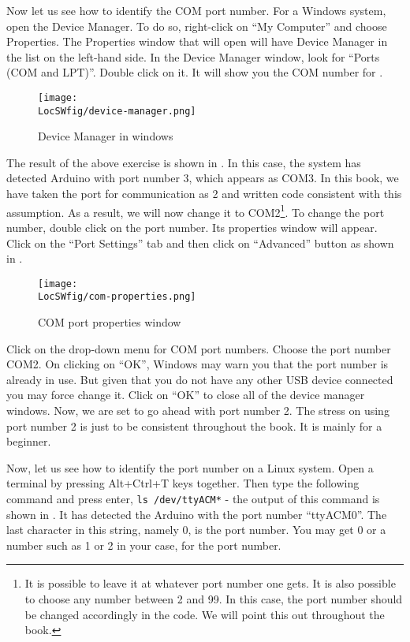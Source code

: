 Now let us see how to identify the COM port number. For a Windows
system, open the Device Manager. To do so, right-click on ``My
Computer'' and choose Properties. The Properties window that will open
will have Device Manager in the list on the left-hand side. In the
Device Manager window, look for ``Ports (COM and LPT)''. Double click on
it. It will show you the COM number for \arduino. 

\begin{figure}
      \centering
      \texttt{[image: \\LocSWfig/device-manager.png]}
      \caption{Device Manager in windows}
      \label{dev-mgr}
\end{figure}

The result of the above exercise is shown in .  In
this case, the system has detected Arduino with port number 3, which
appears as COM3.  In this book, we have taken the port for
communication as 2 and written code consistent with this assumption.    
As a result, we will now change it to
COM2\footnote{\label{fn:port}It is possible to leave it at whatever
      port number one gets.  It is also possible to choose any number
      between 2 and 99.  In this case, the port number should be
      changed accordingly in the code.  We will point this out throughout
      the book.}.  To change the port number, double click on the port
number. Its properties window will appear. Click on the ``Port
Settings'' tab and then click on ``Advanced'' button as shown in
.

\begin{figure}
      \centering
      \texttt{[image: \\LocSWfig/com-properties.png]}
      \caption{COM port properties window}
      \label{com}
\end{figure}

Click on the drop-down menu for COM port numbers. Choose the port
number COM2.  On clicking on ``OK'', Windows may warn you that the port
number is already in use. But given that you do not have any other USB
device connected you may force change it. Click on ``OK'' to close
all of the device manager windows. Now, we are set to go ahead with
port number 2. The stress on using port number 2 is just to be
consistent throughout the book. It is mainly for a beginner.

Now, let us see how to identify the port number on a Linux
system. Open a terminal by pressing Alt+Ctrl+T keys together. Then
type the following command and press enter, {\tt ls
            /dev/ttyACM*} -
the output of this command is shown in . It has
detected the Arduino with the port number ``ttyACM0''.  The last character
in this string, namely 0, is the port number.  You may get 0 or a
number such as 1 or 2 in your case, for the port number.

